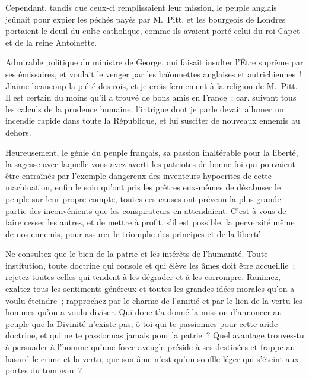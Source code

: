 \documentclass[french,twoside]{book} %
\begin{document}
Cependant, tandis que ceux-ci remplissaient leur mission, le peuple anglais jeûnait pour expier les péchés payés par M. Pitt, et les bourgeois de Londres portaient le deuil du culte catholique, comme ils avaient porté celui du roi Capet et de la reine Antoinette.\par
Admirable politique du ministre de George, qui faisait insulter l’Être suprême par ses émissaires, et voulait le venger par les baïonnettes anglaises et autrichiennes ! J’aime beaucoup la piété des rois, et je crois fermement à la religion de M. Pitt. Il est certain du moins qu’il a trouvé de bons amis en France ; car, suivant tous les calculs de la prudence humaine, l’intrigue dont je parle devait allumer un incendie rapide dans toute la République, et lui susciter de nouveaux ennemis au dehors.\par
Heureusement, le génie du peuple français, sa passion inaltérable pour la liberté, la sagesse avec laquelle vous avez averti les patriotes de bonne foi qui pouvaient être entraînés par l’exemple dangereux des inventeurs hypocrites de cette machination, enfin le soin qu’ont pris les prêtres eux-mêmes de désabuser le peuple sur leur propre compte, toutes ces causes ont prévenu la plus grande partie des inconvénients que les conspirateurs en attendaient. C’est à vous de faire cesser les autres, et de mettre à profit, s’il est possible, la perversité même de nos ennemis, pour assurer le triomphe des principes et de la liberté.\par
Ne consultez que le bien de la patrie et les intérêts de l’humanité. Toute institution, toute doctrine qui console et qui élève les âmes doit être accueillie ; rejetez toutes celles qui tendent à les dégrader et à les corrompre. Ranimez, exaltez tous les sentiments généreux et toutes les grandes idées morales qu’on a voulu éteindre ; rapprochez par le charme de l’amitié et par le lien de la vertu les hommes qu’on a voulu diviser. Qui donc t’a donné la mission d’annoncer au peuple que la Divinité n’existe pas, ô toi qui te passionnes pour cette aride doctrine, et qui ne te passionnas jamais pour la patrie ? Quel avantage trouves-tu à persuader à l’homme qu’une force aveugle préside à ses destinées et frappe au hasard le crime et la vertu, que son âme n’est qu’un souffle léger qui s’éteint aux portes du tombeau ?\par
\end{document}
